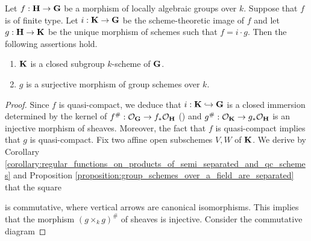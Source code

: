 \begin{theorem}\label{theorem:images_of_locally_algebraic_groups_homomorphisms}
Let $f:\mathbf{H}\rightarrow \mathbf{G}$ be a morphism of locally algebraic groups over $k$. Suppose that $f$ is of finite type. Let $i:\mathbf{K}\rightarrow \mathbf{G}$ be the scheme-theoretic image of $f$ and let $g:\mathbf{H}\rightarrow \mathbf{K}$ be the unique morphism of schemes such that $f = i\cdot g$. Then the following assertions hold.
\begin{enumerate}[label=\emph{\textbf{(\arabic*)}}, leftmargin=3.0em]
\item $\mathbf{K}$ is a closed subgroup $k$-scheme of $\mathbf{G}$.
\item $g$ is a surjective morphism of group schemes over $k$.
\end{enumerate}
\end{theorem}
\begin{proof}
Since $f$ is quasi-compact, we deduce that $i:\mathbf{K} \hookrightarrow \mathbf{G}$ is a closed immersion determined by the kernel of $f^{\#}:{\mathcal O}_{\mathbf{G}}\rightarrow f_*{\mathcal O}_{\mathbf{H}}$ ({\cite[Proposition 10.30]{gortz2010algebraic}}) and $g^{\#}:{\mathcal O}_{\mathbf{K}}\rightarrow g_*{\mathcal O}_{\mathbf{H}}$ is an injective morphism of sheaves. Moreover, the fact that $f$ is quasi-compact implies that $g$ is quasi-compact. Fix two affine open subschemes $V,W$ of $\mathbf{K}$. We derive by Corollary \ref{corollary:regular_functions_on_products_of_semi_separated_and_qc_schemes} and Proposition \ref{proposition:group_schemes_over_a_field_are_separated} that the square
\begin{center}
\end{center}
is commutative, where vertical arrows are canonical isomorphisms. This implies that the morphism $\left(g\times_k g\right)^{\#}$ of sheaves is injective. Consider the commutative diagram

\end{proof}
